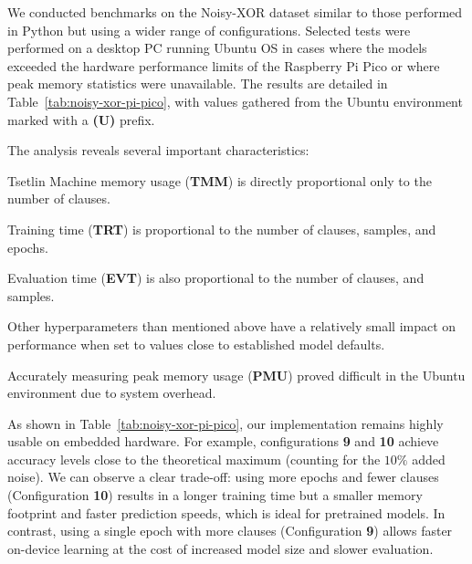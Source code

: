 We conducted benchmarks on the Noisy-XOR dataset similar to those performed in Python but using a wider range of configurations. Selected tests were performed on a desktop PC running Ubuntu OS in cases where the models exceeded the hardware performance limits of the Raspberry Pi Pico or where peak memory statistics were unavailable. The results are detailed in Table~\ref{tab:noisy-xor-pi-pico}, with values gathered from the Ubuntu environment marked with a \textbf{(U)} prefix.

The analysis reveals several important characteristics:
\begin{compactitem}
    \item Tsetlin Machine memory usage (\textbf{TMM}) is directly proportional only to the number of clauses.
    \item Training time (\textbf{TRT}) is proportional to the number of clauses, samples, and epochs.
    \item Evaluation time (\textbf{EVT}) is also proportional to the number of clauses, and samples.
    \item Other hyperparameters than mentioned above have a relatively small impact on performance when set to values close to established model defaults.
    \item Accurately measuring peak memory usage (\textbf{PMU}) proved difficult in the Ubuntu environment due to system overhead.
\end{compactitem}

As shown in Table~\ref{tab:noisy-xor-pi-pico}, our implementation remains highly usable on embedded hardware. For example, configurations \textbf{9} and \textbf{10} achieve accuracy levels close to the theoretical maximum (counting for the $10\%$ added noise). We can observe a clear trade-off: using more epochs and fewer clauses (Configuration \textbf{10}) results in a longer training time but a smaller memory footprint and faster prediction speeds, which is ideal for pretrained models. In contrast, using a single epoch with more clauses (Configuration \textbf{9}) allows faster on-device learning at the cost of increased model size and slower evaluation.

